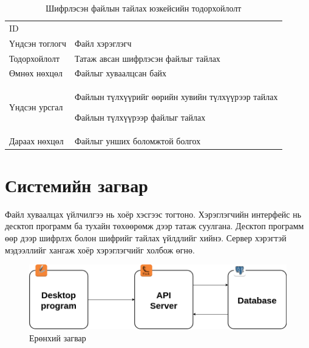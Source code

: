 \begin{table}[H]
    \footnotesize
    \centering
    \begin{tabularx}{\textwidth}{|>{\hsize=0.3\hsize}X|>{\hsize=0.7\hsize}X|}
        \hline
        \multicolumn{2}{|c|}{Шифрлэсэн файлын тайлах} \\
        \hline
        ID & 7 \\
        \hline
        Үндсэн тоглогч & Файл хэрэглэгч\\
        \hline
        Тодорхойлолт & Татаж авсан шифрлэсэн файлыг тайлах\\
        \hline
        Өмнөх нөхцөл & Файлыг хуваалцсан байх\\
        \hline
        Үндсэн урсгал & 
        \item Файлын түлхүүрийг өөрийн хувийн түлхүүрээр тайлах
        \item Файлын түлхүүрээр файлыг тайлах\\
        \hline
        Дараах нөхцөл & Файлыг унших боломжтой болгох\\
        \hline
    \end{tabularx}
    \caption{Шифрлэсэн файлын тайлах юзкейсийн тодорхойлолт}
\end{table}

\section{Системийн загвар}
Файл хуваалцах үйлчилгээ нь хоёр хэсгээс тогтоно. Хэрэглэгчийн интерфейс нь десктоп программ ба тухайн төхөөрөмж дээр татаж суулгана.
Десктоп программ өөр дээр шифрлэх болон шифрийг тайлах үйлдлийг хийнэ. Сервер хэрэгтэй мэдээллийг хангаж хоёр хэрэглэгчийг холбож өгнө.
\begin{figure}[ht]
    \centering
    \includegraphics[scale=0.5]{Figures/main_diagram.drawio.png}
    \caption[Usecase diagram]{Ерөнхий загвар}
    \label{fig:main_scheme}
\end{figure}

